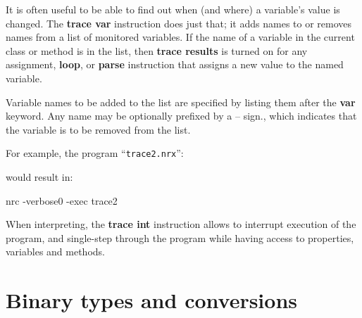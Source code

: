 It is often useful to be able to find out when (and where) a variable’s value is changed. The \textbf{trace var} instruction does just that; it adds names to or removes names from a list of monitored variables. If the name of a variable in the current class or method is in the list, then \textbf{trace results} is turned on for any assignment, \textbf{loop}, or \textbf{parse} instruction that assigns a new value to the named variable.

Variable names to be added to the list are specified by listing them after the \textbf{var} keyword. Any name may be optionally prefixed by a – sign., which indicates that the variable is to be removed from the list.

For example, the program “\texttt{trace2.nrx}”:


would result in:

\begin{shaded}
\bash[stderr]
nrc -verbose0 -exec trace2
\END
\end{shaded}

When interpreting, the \textbf{trace int} instruction allows to interrupt execution of the program, and single-step
through the program while having access to properties, variables and methods.

\section{Binary types and conversions}\label{binarith}

